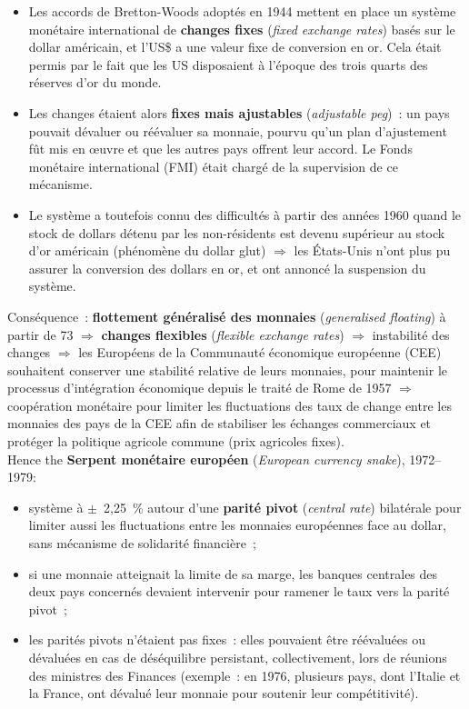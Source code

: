 \begin{itemize}
  \item Les accords de Bretton-Woods adoptés en 1944 mettent en place un système
    monétaire international de \textbf{changes fixes} (\textit{fixed exchange rates})
    basés sur le dollar américain, et l'US\$ a une valeur fixe de conversion en or.
    Cela était permis par le fait que les US disposaient à l'époque des trois quarts
    des réserves d'or du monde.
  \item Les changes étaient alors \textbf{fixes mais ajustables} (\textit{adjustable
    peg})~: un pays pouvait dévaluer ou réévaluer sa monnaie, pourvu qu'un plan
    d'ajustement fût mis en œuvre et que les autres pays offrent leur accord. Le Fonds
    monétaire international (FMI) était chargé de la supervision de ce mécanisme.
  \item Le système a toutefois connu des difficultés à partir des années 1960 quand le
    stock de dollars détenu par les non-résidents est devenu supérieur au stock d'or
    américain (phénomène du dollar glut) $\Rightarrow$ les États-Unis n'ont plus pu
    assurer la conversion des dollars en or, et ont annoncé la suspension du système.
\end{itemize}

Conséquence~: \textbf{flottement généralisé des monnaies} (\textit{generalised floating})
à partir de 73 $\Rightarrow$ \textbf{changes flexibles} (\textit{flexible exchange
rates}) $\Rightarrow$ instabilité des changes $\Rightarrow$ les Européens de la
Communauté économique européenne (CEE) souhaitent conserver une stabilité relative de
leurs monnaies, pour maintenir le processus d'intégration économique depuis le traité de
Rome de 1957 $\Rightarrow$ coopération monétaire pour limiter les fluctuations des taux
de change entre les monnaies des pays de la CEE afin de stabiliser les échanges
commerciaux et protéger la politique agricole commune (prix agricoles fixes).\\

Hence the \textbf{Serpent monétaire européen} (\textit{European currency snake}),
1972--1979:
\begin{itemize}
  \item système à $\pm$~2,25~\% autour d'une \textbf{parité pivot} (\textit{central
    rate}) bilatérale pour limiter aussi les fluctuations entre les monnaies européennes
    face au dollar, sans mécanisme de solidarité financière~;
  \item si une monnaie atteignait la limite de sa marge, les banques centrales des deux
    pays concernés devaient intervenir pour ramener le taux vers la parité pivot~;
  \item les parités pivots n'étaient pas fixes~: elles pouvaient être réévaluées ou
    dévaluées en cas de déséquilibre persistant, collectivement, lors de réunions des
    ministres des Finances (exemple~: en 1976, plusieurs pays, dont l'Italie et la
    France, ont dévalué leur monnaie pour soutenir leur compétitivité).
\end{itemize}

